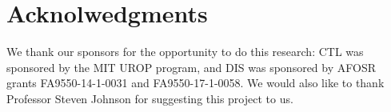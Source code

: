 \documentclass[11pt]{article}
\begin{document}
\section{Acknolwedgments}

\begin{comment}


I would like to thank my UROP advisor, Dr. David Spivak, for his guidance, encouragement, and insight in helping me understand and conduct independent research into the pixel array method. I would also like to thank Professor Steven Johnson for the inspiration for this project.

\end{comment}

We thank our sponsors for the opportunity to do this research: CTL was sponsored by the MIT UROP program, and DIS was sponsored by AFOSR grants FA9550-14-1-0031 and FA9550-17-1-0058. We would also like to thank Professor Steven Johnson for suggesting this project to us.
\end{document}

